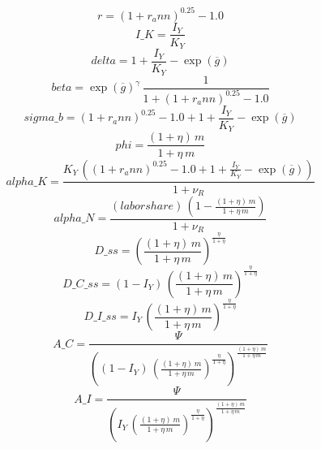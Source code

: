 \begin{dmath*}
r = \left(1+{{r_ann}}\right)^{0.25}-1.0
\end{dmath*}
\begin{dmath*}
I\_K = \frac{{{I_Y}}}{{{K_Y}}}
\end{dmath*}
\begin{dmath*}
delta = 1+\frac{{{I_Y}}}{{{K_Y}}}-\exp\left({{\overline{g}}}\right)
\end{dmath*}
\begin{dmath*}
beta = \exp\left({{\overline{g}}}\right)^{{{\gamma}}}\, \frac{1}{1+\left(1+{{r_ann}}\right)^{0.25}-1.0}
\end{dmath*}
\begin{dmath*}
sigma\_b = \left(1+{{r_ann}}\right)^{0.25}-1.0+1+\frac{{{I_Y}}}{{{K_Y}}}-\exp\left({{\overline{g}}}\right)
\end{dmath*}
\begin{dmath*}
phi = \frac{\left(1+{{\eta}}\right)\, {{m}}}{1+{{\eta}}\, {{m}}}
\end{dmath*}
\begin{dmath*}
alpha\_K = \frac{{{K_Y}}\, \left(\left(1+{{r_ann}}\right)^{0.25}-1.0+1+\frac{{{I_Y}}}{{{K_Y}}}-\exp\left({{\overline{g}}}\right)\right)}{1+{{\nu_R}}}
\end{dmath*}
\begin{dmath*}
alpha\_N = \frac{{(labor share)}\, \left(1-\frac{\left(1+{{\eta}}\right)\, {{m}}}{1+{{\eta}}\, {{m}}}\right)}{1+{{\nu_R}}}
\end{dmath*}
\begin{dmath*}
D\_ss = \left(\frac{\left(1+{{\eta}}\right)\, {{m}}}{1+{{\eta}}\, {{m}}}\right)^{\frac{{{\eta}}}{1+{{\eta}}}}
\end{dmath*}
\begin{dmath*}
D\_C\_ss = \left(1-{{I_Y}}\right)\, \left(\frac{\left(1+{{\eta}}\right)\, {{m}}}{1+{{\eta}}\, {{m}}}\right)^{\frac{{{\eta}}}{1+{{\eta}}}}
\end{dmath*}
\begin{dmath*}
D\_I\_ss = {{I_Y}}\, \left(\frac{\left(1+{{\eta}}\right)\, {{m}}}{1+{{\eta}}\, {{m}}}\right)^{\frac{{{\eta}}}{1+{{\eta}}}}
\end{dmath*}
\begin{dmath*}
A\_C = \frac{{{\Psi}}}{\left(\left(1-{{I_Y}}\right)\, \left(\frac{\left(1+{{\eta}}\right)\, {{m}}}{1+{{\eta}}\, {{m}}}\right)^{\frac{{{\eta}}}{1+{{\eta}}}}\right)^{\frac{\left(1+{{\eta}}\right)\, {{m}}}{1+{{\eta}}\, {{m}}}}}
\end{dmath*}
\begin{dmath*}
A\_I = \frac{{{\Psi}}}{\left({{I_Y}}\, \left(\frac{\left(1+{{\eta}}\right)\, {{m}}}{1+{{\eta}}\, {{m}}}\right)^{\frac{{{\eta}}}{1+{{\eta}}}}\right)^{\frac{\left(1+{{\eta}}\right)\, {{m}}}{1+{{\eta}}\, {{m}}}}}
\end{dmath*}
